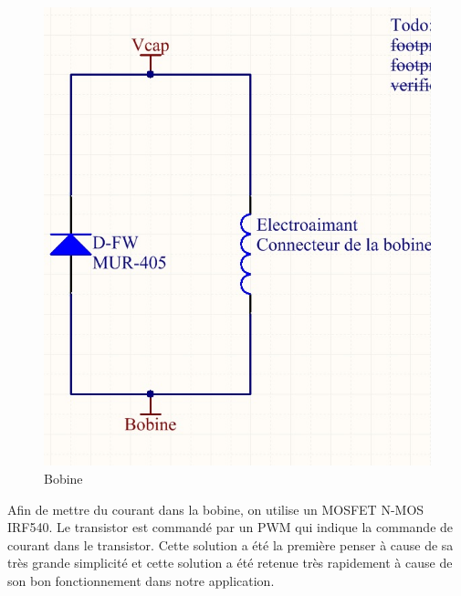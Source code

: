   \begin{figure}[H]
    \label{Bobine}
    \centering
    \includegraphics[scale=0.3]{resources/bobine.jpg}
    \caption{Bobine}
  \end{figure}

Afin de mettre du courant dans la bobine, on utilise un MOSFET N-MOS IRF540.
Le transistor est commandé par un PWM qui indique la commande de courant dans le transistor.
Cette solution a été la première penser à cause de sa très grande simplicité et cette solution a été retenue très rapidement à cause de son bon fonctionnement dans notre application.


